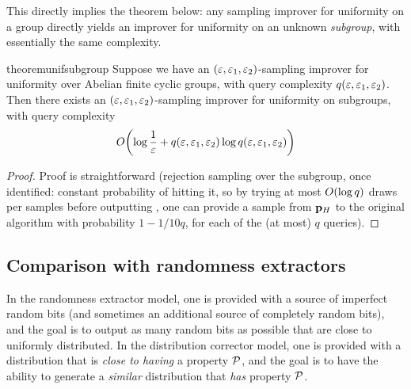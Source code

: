 This directly implies the theorem below: any sampling improver for uniformity on a group directly yields an improver for uniformity on an unknown \emph{subgroup}, with essentially the same complexity.
\begin{restatable}{theorem}{unifsubgroup}\label{lemma:correcting:subgroup:rejection:sampling}
Suppose we have an $(\varepsilon,\varepsilon_1,\varepsilon_2)$-sampling improver for uniformity over Abelian finite cyclic groups, with query complexity $q(\varepsilon,\varepsilon_1,\varepsilon_2)$.
Then there exists an $(\varepsilon,\varepsilon_1,\varepsilon_2)$-sampling improver for uniformity on subgroups, with query complexity
\[
\bigO{ \log\frac{1}{\eps} + q(\eps,\eps_1,\eps_2)\log q(\eps,\eps_1,\eps_2) }
\]
\end{restatable}
\begin{proof}Proof is straightforward (rejection sampling over the subgroup, once identified: constant probability of hitting it, so by trying at most $\bigO{\log q}$ draws per samples before outputting \fail, one can provide a sample from $\mathbf{p}_H$ to the original algorithm with probability $1-1/10q$, for each of the (at most) $q$ queries).
\end{proof}

\subsection{Comparison with randomness extractors}\label{sec:unif:extractors}
In the randomness extractor model, 
one is provided with a
source of imperfect random bits (and sometimes an
additional source of completely random bits),
and the goal is to output as many random
bits as possible that are close to uniformly distributed.
In the distribution corrector model, one
is provided with a distribution that is  \emph{close to
having} a property $\mathcal{P}$, and the goal is to have the ability to
generate a  \emph{similar}
distribution that  \emph{has} property $\mathcal{P}$.

